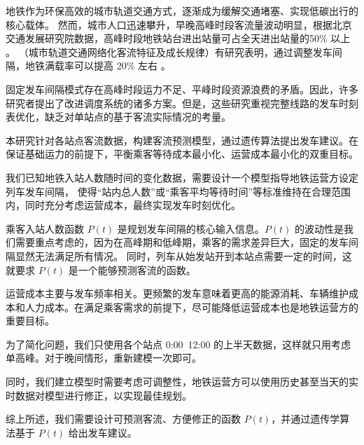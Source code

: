 \setcounter{page}{1}



地铁作为环保高效的城市轨道交通方式，逐渐成为缓解交通堵塞、实现低碳出行的核心载体。
然而，城市人口迅速攀升，早晚高峰时段客流量波动明显，根据北京交通发展研究院数据，高峰时段地铁站台进出站量可占全天进出站量的50\% 以上 \cite{BeijingTransportDevReport2024}。
（城市轨道交通网络化客流特征及成长规律）有研究表明，通过调整发车间隔，地铁满载率可以提高 20\% 左右 \cite{PFAndGrowthPattern}。

固定发车间隔模式存在高峰时段运力不足、平峰时段资源浪费的矛盾。因此，许多研究者提出了改进调度系统的诸多方案。但是，这些研究重视完整线路的发车时刻表优化，缺乏对单站点的基于客流实际情况的考量。

本研究针对各站点客流数据，构建客流预测模型，通过遗传算法提出发车建议。在保证基础运力的前提下，平衡乘客等待成本最小化、运营成本最小化的双重目标。


我们已知地铁入站人数随时间的变化数据，需要设计一个模型指导地铁运营方设定列车发车间隔，
使得“站内总人数”或“乘客平均等待时间”等标准维持在合理范围内，同时充分考虑运营成本，最终实现发车时刻优化。



乘客入站人数函数 $P(t)$ 是规划发车间隔的核心输入信息。$P(t)$ 的波动性是我们需要重点考虑的，因为在高峰期和低峰期，乘客的需求差异巨大，固定的发车间隔显然无法满足所有情况。
同时，列车从始发站开到本站点需要一定的时间，这就要求 $P(t)$ 是一个能够预测客流的函数。

运营成本主要与发车频率相关。更频繁的发车意味着更高的能源消耗、车辆维护成本和人力成本。在满足乘客需求的前提下，尽可能降低运营成本也是地铁运营方的重要目标。

为了简化问题，我们只使用各个站点 0:00~12:00 的上半天数据，这样就只用考虑单高峰。对于晚间情形，重新建模一次即可。

同时，我们建立模型时需要考虑可调整性，地铁运营方可以使用历史甚至当天的实时数据对模型进行修正，以实现最佳规划。

综上所述，我们需要设计可预测客流、方便修正的函数 $P(t)$，并通过遗传学算法基于 $P(t)$ 给出发车建议。


